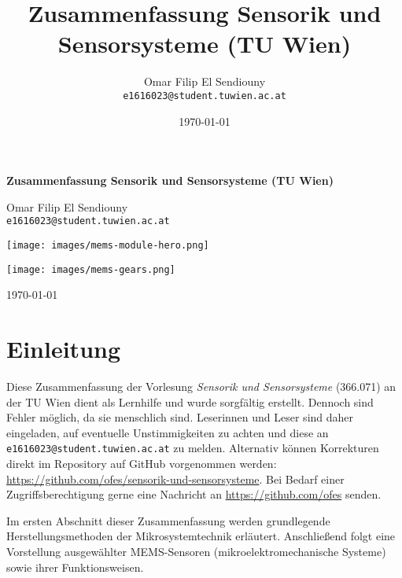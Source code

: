 \documentclass{article} %
\title{Zusammenfassung Sensorik und Sensorsysteme (TU Wien)}
\author{Omar Filip El Sendiouny \\ \texttt{e1616023@student.tuwien.ac.at}}
\date{\today}
\begin{document}
\begin{titlepage}
    \centering
    \vspace{2cm}
    {\Huge \bfseries Zusammenfassung Sensorik und Sensorsysteme (TU Wien) \par}
    
    \vspace{1cm}
    {\Large Omar Filip El Sendiouny \\ \texttt{e1616023@student.tuwien.ac.at} \par}

    \vspace*{2cm}

    \texttt{[image: images/mems-module-hero.png]}
    
    \texttt{[image: images/mems-gears.png]} 

    \vspace*{2cm} 
    
    \vfill
    
    {\large \today \par}
\end{titlepage}

\tableofcontents
\listoftables
\listoffigures
\thispagestyle{empty}
\newpage


\section*{Einleitung} %
Diese Zusammenfassung der Vorlesung \textit{Sensorik und Sensorsysteme} (366.071) an der TU Wien dient als Lernhilfe und wurde sorgfältig erstellt. Dennoch sind 
Fehler möglich, da sie menschlich sind. Leserinnen und Leser sind daher eingeladen, auf eventuelle Unstimmigkeiten zu achten und diese an 
\texttt{e1616023@student.tuwien.ac.at} zu melden. Alternativ können Korrekturen direkt im Repository auf GitHub vorgenommen werden: \\ 
\url{https://github.com/ofes/sensorik-und-sensorsysteme}. Bei Bedarf einer Zugriffsberechtigung gerne eine Nachricht an \url{https://github.com/ofes} senden.

\vspace{1em}

Im ersten Abschnitt dieser Zusammenfassung werden grundlegende Herstellungsmethoden der Mikrosystemtechnik erläutert. Anschließend folgt eine Vorstellung 
ausgewählter MEMS-Sensoren (mikroelektromechanische Systeme) sowie ihrer Funktionsweisen.
\end{document}
